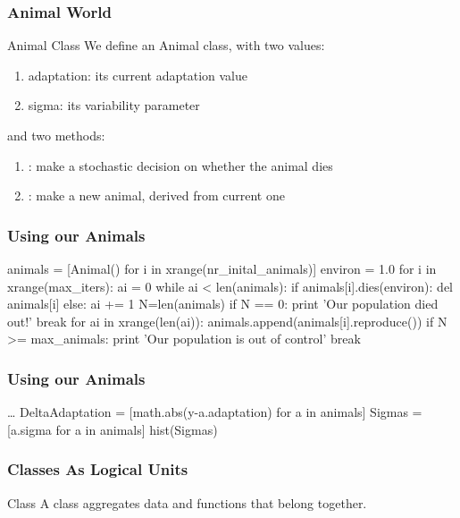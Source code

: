 \begin{frame}[fragile] %
\frametitle{Animal World}
\begin{block}{Animal Class}
We define an Animal class, with two values:
\begin{enumerate}
\item adaptation: its current adaptation value
\item sigma: its variability parameter
\end{enumerate}
and two methods:
\begin{enumerate}
\item {}: make a stochastic decision on whether the animal dies
\item {}: make a new animal, derived from current one
\end{enumerate}
\end{block}

\end{frame}

\begin{frame}[fragile] %
\frametitle{Using our Animals}
\begin{python}
animals = [Animal() for i in xrange(nr_inital_animals)]
environ = 1.0
for i in xrange(max_iters):
    ai = 0
    while ai < len(animals):
        if animals[i].dies(environ): del animals[i]
        else: ai += 1
    N=len(animals)
    if N == 0:
        print 'Our population died out!'
        break
    for ai in xrange(len(ai)):
        animals.append(animals[i].reproduce())
    if N >= max_animals:
        print 'Our population is out of control'
        break
\end{python}
\end{frame}

\begin{frame}[fragile] %
\frametitle{Using our Animals}

\begin{python}
\ldots
DeltaAdaptation = [math.abs(y-a.adaptation) 
                    for a in animals]
Sigmas = [a.sigma for a in animals]
hist(Sigmas)
\end{python}

\end{frame}

\begin{frame}[fragile] %
\frametitle{Classes As Logical Units}
\begin{block}{Class}
A class aggregates data and functions that belong together.
\end{block}
\end{frame}

